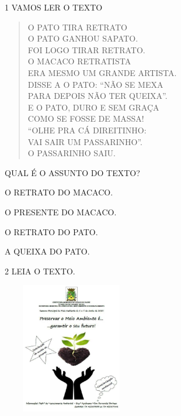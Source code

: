 
\num{1} VAMOS LER O TEXTO

\begin{verse}
O PATO TIRA RETRATO\\
O PATO GANHOU SAPATO.\\
FOI LOGO TIRAR RETRATO.\\
O MACACO RETRATISTA\\
ERA MESMO UM GRANDE ARTISTA.\\
DISSE A O PATO: “NÃO SE MEXA\\
PARA DEPOIS NÃO TER QUEIXA”.\\
E O PATO, DURO E SEM GRAÇA\\
COMO SE FOSSE DE MASSA!\\
“OLHE PRA CÁ DIREITINHO:\\
VAI SAIR UM PASSARINHO”.\\
O PASSARINHO SAIU.
\end{verse}


QUAL É O ASSUNTO DO TEXTO?

\begin{escolha}
\item O RETRATO DO MACACO.

\item O PRESENTE DO MACACO.

\item O RETRATO DO PATO.

\item A QUEIXA DO PATO.
\end{escolha}

\num{2} LEIA O TEXTO.

\includegraphics[width=2.37500in,height=2.25000in]{media/image166.jpg}

